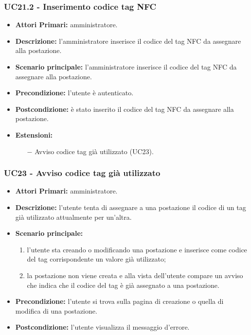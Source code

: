 \subsubsection{UC21.2 - Inserimento codice tag NFC}
\begin{itemize}
	\item\textbf{Attori Primari:}
	amministratore.
	\item\textbf{Descrizione:}
	l'amministratore inserisce il codice del tag NFC da assegnare alla postazione.
	\item\textbf{Scenario principale:} 
	l'amministratore inserisce il codice del tag NFC da assegnare alla postazione.
	\item\textbf{Precondizione:} 
	l'utente è autenticato.
	\item\textbf{Postcondizione:}
	è stato inserito il codice del tag NFC da assegnare alla postazione.
	\item\textbf{Estensioni:}
	\begin{itemize}
		\item[$-$] Avviso codice tag già utilizzato (UC23).
	\end{itemize}
\end{itemize}
\subsubsection{UC23 - Avviso codice tag già utilizzato}
\begin{itemize}
	\item\textbf{Attori Primari:}
	amministratore.
	\item\textbf{Descrizione:}
	l'utente tenta di assegnare a una postazione il codice di un tag già utilizzato attualmente per un'altra.
	\item\textbf{Scenario principale:}
	\begin{enumerate}
		\item l'utente sta creando o modificando una postazione e inserisce come codice del tag corrispondente un valore già utilizzato;
		\item la postazione non viene creata e alla vista dell'utente compare un avviso che indica che il codice del tag è già assegnato a una postazione.
	\end{enumerate}
	\item\textbf{Precondizione:}
	l'utente si trova sulla pagina di creazione o quella di modifica di una postazione.
	\item\textbf{Postcondizione:}
	l'utente visualizza il messaggio d'errore.
\end{itemize}

